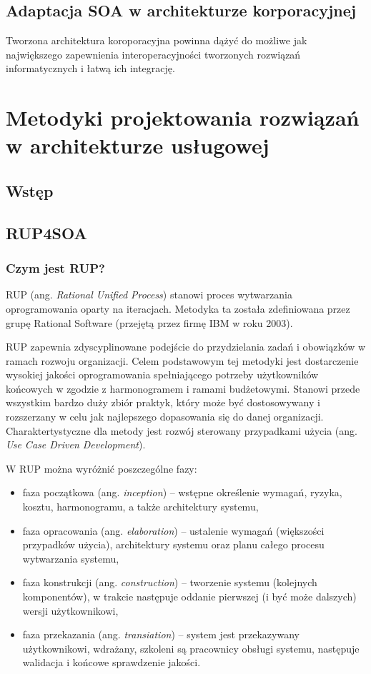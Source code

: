 \section{Adaptacja SOA w architekturze korporacyjnej}
Tworzona architektura koroporacyjna powinna dążyć do możliwe jak największego zapewnienia interoperacyjności tworzonych rozwiązań informatycznych i łatwą ich integrację. 

\chapter{Metodyki projektowania rozwiązań w architekturze usługowej}

\section{Wstęp}


\section{RUP4SOA}
\subsection{Czym jest RUP?}
RUP (ang. \textit{Rational Unified Process}) stanowi proces  wytwarzania oprogramowania oparty na iteracjach. Metodyka ta została zdefiniowana przez grupę Rational Software (przejętą przez firmę IBM w roku 2003). 

RUP zapewnia zdyscyplinowane podejście do przydzielania zadań i obowiązków w ramach rozwoju organizacji. Celem podstawowym tej metodyki jest dostarczenie wysokiej jakości oprogramowania spełniającego potrzeby użytkowników końcowych w zgodzie z harmonogramem i ramami budżetowymi.
\cite{RUPIntRat} Stanowi przede wszystkim bardzo duży zbiór praktyk, który może być dostosowywany i rozszerzany w celu jak najlepszego dopasowania się do danej organizacji. Charaktertystyczne dla metody jest rozwój sterowany przypadkami użycia (ang. \textit{Use Case Driven Development}).\cite{RUPMartFow}

W RUP można wyróżnić poszczególne fazy:
\begin{itemize}
\item{faza początkowa (ang. \textit{inception}) – wstępne określenie wymagań, ryzyka, kosztu, harmonogramu, a także architektury systemu,}
\item{faza opracowania (ang. \textit{elaboration}) – ustalenie wymagań (większości przypadków użycia), architektury systemu oraz planu całego procesu wytwarzania systemu,}
\item{faza konstrukcji (ang. \textit{construction}) – tworzenie systemu (kolejnych komponentów), w trakcie następuje oddanie pierwszej (i być może dalszych) wersji użytkownikowi,}
\item{faza przekazania (ang. \textit{transiation}) – system jest przekazywany użytkownikowi, wdrażany, szkoleni są pracownicy obsługi systemu, następuje walidacja i końcowe sprawdzenie jakości.}\cite{RUPIntRat}
\end{itemize}
